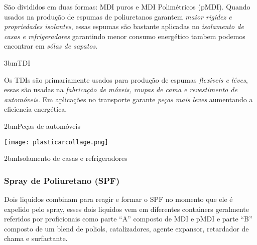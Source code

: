 \documentclass[\mainfilename]{subfiles}
\begin{document}
\begin{sectionBox}
\begin{sectionBox}
\begin{multicols}{2}
\begin{sectionBox}
                São divididos em duas formas: MDI puros e MDI Polimétricos (pMDI). Quando usados na produção de espumas de poliuretanos garantem \emph{maior rigidez e propriedades isolantes}, essas espumas são bastante aplicadas no \emph{isolamento de casas e refrigeradores} garantindo menor consumo energético tambem podemos encontrar em \emph{sólas de sapatos}.
            \end{sectionBox}
            \begin{sectionBox}3bm{TDI} %
                
                Os TDIs são primariamente usados para produção de espumas \emph{flexiveis e léves}, essas são usadas na \emph{fabricação de móveis, roupas de cama e revestimento de automóveis}.
                Em aplicações no transporte garante \emph{peças mais leves} aumentando a eficiencia energética.
                
            \end{sectionBox}
        \end{multicols}
        
    \end{sectionBox}

    \begin{sectionBox}2bm{Peças de automóveis} %
        
        \begin{center}
            \texttt{[image: plasticarcollage.png]}
        \end{center}
        
    \end{sectionBox}

    \begin{sectionBox}2bm{Isolamento de casas e refrigeradores} %
        
        \subsubsection{Spray de Poliuretano (SPF)\cite{SPF}}
        Dois liquidos combinam para reagir e formar o SPF no momento que ele é expelido pelo spray, esses dois liquidos vem em diferentes containers geralmente referidos por proficionais como parte ``A'' composto de MDI e pMDI e parte ``B'' composto de um blend de poliols, catalizadores, agente expansor, retardador de chama e surfactante.

\end{sectionBox}
\end{sectionBox}
\end{document}

